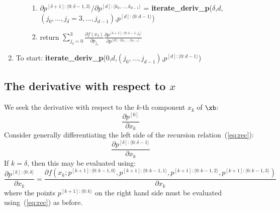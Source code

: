 \documentclass[11pt]{article}
\begin{document}
\begin{enumerate}
\begin{enumerate}
\begin{enumerate}
\item $\partial p^{[\delta+1]:\langle 0: \delta-1, 3 \rangle} / \partial p^{[d] : \langle k_0, \dots, k_{d-1} \rangle}$ = \textbf{iterate\_deriv\_p}($\delta$,$d$,$(j_0, \dots, j_\delta=3, \dots, j_{d-1})$,$p^{[d]:\langle 0:d-1 \rangle}$)
\item return $\sum_{j_\delta=0}^3 
\frac{
\partial f(x_\delta)
}{
\partial p_{j_\delta}
}
\frac{\partial p^{[\delta+1]: \langle 0:\delta-1,j_\delta \rangle}
}{
\partial p^{[d]: \langle k_0, \dots, k_{d-1} \rangle}
}
$
\end{enumerate}
\end{enumerate}

\item To start: \textbf{iterate\_deriv\_p}(0,$d$,$(j_0, \dots, j_{d-1})$,$p^{[d]:\langle 0:d-1 \rangle}$)
\end{enumerate}




\subsection{The derivative with respect to $x$}


We seek the derivative with respect to the $k$-th component $x_k$ of $\xb$:
\begin{equation}
\frac{\partial p^{[0]}}{\partial x_k}
\end{equation}
Consider generally differentiating the left side of the recursion relation~(\ref{eq:rec}):
\begin{equation}
\frac{\partial p^{[\delta]: \langle 0:\delta-1 \rangle} }{\partial x_k} 
\end{equation}
If $k = \delta$, then this may be evaluated using:
\begin{equation}
\frac{\partial p^{[k]: \langle 0:\delta \rangle}
}{
\partial x_k
}
=
\frac{\partial 
f \left ( 
x_{k} ; 
p^{[k+1]: \langle 0:k-1,0 \rangle},
p^{[k+1]: \langle 0:k-1,1 \rangle},
p^{[k+1]: \langle 0:k-1,2 \rangle},
p^{[k+1]: \langle 0:k-1,3 \rangle}
\right ) 
}{
\partial x_k
}
\label{eq:evalk}
\end{equation}
where the points $p^{[k+1]: \langle 0:k \rangle}$ on the right hand side must be evaluated using~(\ref{eq:rec}) as before.
\end{document}
